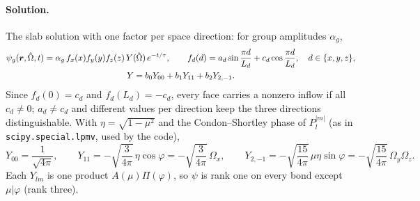 \documentclass[11pt,a4paper]{article}
\newcommand{\Om}{\hat{\Omega}}
\newcommand{\code}[1]{\texttt{#1}}
\begin{document}
\paragraph{Solution.} The slab solution with one factor per space direction: for group amplitudes $\alpha_g$,
\begin{gather}
\psi_g(\bm r,\Om,t)=\alpha_g\,f_x(x)f_y(y)f_z(z)\,Y(\Om)\,e^{-t/\tau},\qquad
f_d(d)=a_d\sin\frac{\pi d}{L_d}+c_d\cos\frac{\pi d}{L_d},\quad d\in\{x,y,z\},
\label{eq:mms}\\
Y=b_0Y_{00}+b_1Y_{11}+b_2Y_{2,-1}.\notag
\end{gather}
Since $f_d(0)=c_d$ and $f_d(L_d)=-c_d$, every face carries a nonzero inflow if all $c_d\ne0$; $a_d\ne c_d$ and different values per direction keep the three directions distinguishable. With $\eta=\sqrt{1-\mu^2}$ and the Condon--Shortley phase of $P_l^{|m|}$ (as in \code{scipy.special.lpmv}, used by the code),
\begin{equation}
Y_{00}=\frac{1}{\sqrt{4\pi}},\qquad
Y_{11}=-\sqrt{\frac{3}{4\pi}}\,\eta\cos\varphi=-\sqrt{\frac{3}{4\pi}}\,\Omega_x,\qquad
Y_{2,-1}=-\sqrt{\frac{15}{4\pi}}\,\mu\eta\sin\varphi=-\sqrt{\frac{15}{4\pi}}\,\Omega_y\Omega_z .
\label{eq:mms-Y}
\end{equation}
Each $Y_{lm}$ is one product $A(\mu)\Pi(\varphi)$, so $\psi$ is rank one on every bond except $\mu|\varphi$ (rank three).
\end{document}
